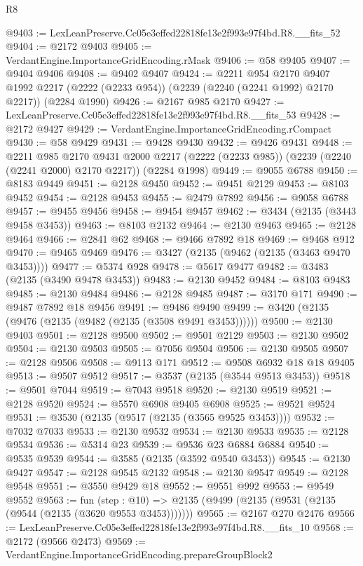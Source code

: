 \begin{lexlean}{R8}
\begin{coremodule}
@9403 := LexLeanPreserve.Cc05e3effed22818fe13e2f993e97f4bd.R8.__fits_52
@9404 := @2172 @9403
@9405 := VerdantEngine.ImportanceGridEncoding.rMask
@9406 := @58 @9405
@9407 := @9404 @9406
@9408 := @9402 @9407
@9424 := @2211
    @954
    @2170
    @9407
    @1992
    @2217
    (@2222 (@2233 @954))
    (@2239 (@2240 (@2241 @1992) @2170 @2217))
    (@2284 @1990)
@9426 := @2167 @985 @2170
@9427 := LexLeanPreserve.Cc05e3effed22818fe13e2f993e97f4bd.R8.__fits_53
@9428 := @2172 @9427
@9429 := VerdantEngine.ImportanceGridEncoding.rCompact
@9430 := @58 @9429
@9431 := @9428 @9430
@9432 := @9426 @9431
@9448 := @2211
    @985
    @2170
    @9431
    @2000
    @2217
    (@2222 (@2233 @985))
    (@2239 (@2240 (@2241 @2000) @2170 @2217))
    (@2284 @1998)
@9449 := @9055 @6788
@9450 := @8183 @9449
@9451 := @2128 @9450
@9452 := @9451 @2129
@9453 := @8103 @9452
@9454 := @2128 @9453
@9455 := @2479 @7892
@9456 := @9058 @6788
@9457 := @9455 @9456
@9458 := @9454 @9457
@9462 := @3434 (@2135 (@3443 @9458 @3453))
@9463 := @8103 @2132
@9464 := @2130 @9463
@9465 := @2128 @9464
@9466 := @2841 @62
@9468 := @9466 @7892 @18
@9469 := @9468 @912
@9470 := @9465 @9469
@9476 := @3427 (@2135 (@9462 (@2135 (@3463 @9470 @3453))))
@9477 := @5374 @928
@9478 := @5617 @9477
@9482 := @3483 (@2135 (@3490 @9478 @3453))
@9483 := @2130 @9452
@9484 := @8103 @9483
@9485 := @2130 @9484
@9486 := @2128 @9485
@9487 := @3170 @171
@9490 := @9487 @7892 @18 @9456
@9491 := @9486 @9490
@9499 := @3420 (@2135 (@9476 (@2135 (@9482 (@2135 (@3508 @9491 @3453))))))
@9500 := @2130 @9403
@9501 := @2128 @9500
@9502 := @9501 @2129
@9503 := @2130 @9502
@9504 := @2130 @9503
@9505 := @7056 @9504
@9506 := @2130 @9505
@9507 := @2128 @9506
@9508 := @9113 @171
@9512 := @9508 @6932 @18 @18 @9405
@9513 := @9507 @9512
@9517 := @3537 (@2135 (@3544 @9513 @3453))
@9518 := @9501 @7044
@9519 := @7043 @9518
@9520 := @2130 @9519
@9521 := @2128 @9520
@9524 := @5570 @6908 @9405 @6908
@9525 := @9521 @9524
@9531 := @3530 (@2135 (@9517 (@2135 (@3565 @9525 @3453))))
@9532 := @7032 @7033
@9533 := @2130 @9532
@9534 := @2130 @9533
@9535 := @2128 @9534
@9536 := @5314 @23
@9539 := @9536 @23 @6884 @6884
@9540 := @9535 @9539
@9544 := @3585 (@2135 (@3592 @9540 @3453))
@9545 := @2130 @9427
@9547 := @2128 @9545 @2132
@9548 := @2130 @9547
@9549 := @2128 @9548
@9551 := @3550 @9429 @18
@9552 := @9551 @992
@9553 := @9549 @9552
@9563 := fun (step : @10) =>
  @2135 (@9499 (@2135 (@9531 (@2135 (@9544 (@2135 (@3620 @9553 @3453)))))))
@9565 := @2167 @270 @2476
@9566 := LexLeanPreserve.Cc05e3effed22818fe13e2f993e97f4bd.R8.__fits_10
@9568 := @2172 (@9566 @2473)
@9569 := VerdantEngine.ImportanceGridEncoding.prepareGroupBlock2

\end{coremodule}
\end{lexlean}
